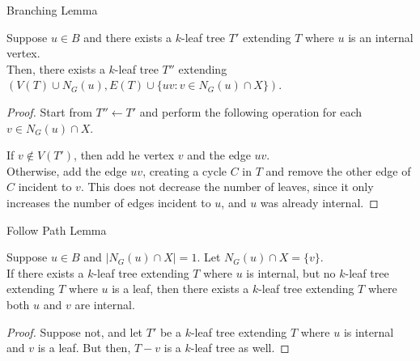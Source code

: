 \begin{frame}{Branching Lemma}

 \begin{lemma}
  Suppose $u\in B$ and there exists a $k$-leaf tree $T'$ extending $T$ where $u$ is an internal vertex.\\
  Then, there exists a $k$-leaf tree $T''$ extending $(V(T) \cup N_G(u), E(T) \cup \{uv : v \in N_G(u) \cap X\})$.
 \end{lemma}
 \pause
 \begin{proof}
  Start from $T'' \leftarrow T'$ and perform the following operation for each $v\in N_G(u)\cap X$.
  
  If $v \notin V(T')$, then add he vertex $v$ and the edge $uv$.\\
  Otherwise, add the edge $uv$, creating a cycle $C$ in $T$ and remove the other edge of $C$ incident to $v$. This does not decrease the number of leaves, since it only increases the number of edges incident to $u$, and $u$ was already internal.
 \end{proof}

\end{frame}


\begin{frame}{Follow Path Lemma}

 \begin{lemma}
  Suppose $u\in B$ and $|N_G(u) \cap X|=1$. Let $N_G(u) \cap X = \{v\}$.\\
  If there exists a $k$-leaf tree extending $T$ where $u$ is internal, but no $k$-leaf tree extending $T$ where $u$ is a leaf, then there exists a $k$-leaf tree extending $T$ where both $u$ and $v$ are internal.
 \end{lemma}
 \pause
 \begin{proof}
  Suppose not, and let $T'$ be a $k$-leaf tree extending $T$ where $u$ is internal and $v$ is a leaf. But then, $T-v$ is a $k$-leaf tree as well.
 \end{proof}

\end{frame}



